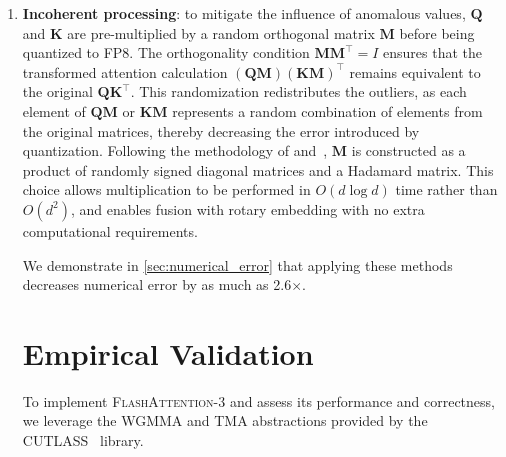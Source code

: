 \begin{algorithm}[H]
\begin{algorithmic}[1]
\begin{enumerate}
\item \textbf{Incoherent processing}: to mitigate the influence of anomalous values, $\mathbf{Q}$ and $\mathbf{K}$ are pre-multiplied by a random orthogonal matrix $\mathbf{M}$ before being quantized to FP8. The orthogonality condition $\mathbf{M} \mathbf{M}^\top = I$ ensures that the transformed attention calculation $(\mathbf{Q} \mathbf{M}) (\mathbf{K} \mathbf{M})^\top$ remains equivalent to the original $\mathbf{Q} \mathbf{K}^\top$. This randomization redistributes the outliers, as each element of $\mathbf{Q} \mathbf{M}$ or $\mathbf{K} \mathbf{M}$ represents a random combination of elements from the original matrices, thereby decreasing the error introduced by quantization. Following the methodology of \citet{chee2024quip} and~\citet{tseng2024quip}, $\mathbf{M}$ is constructed as a product of randomly signed diagonal matrices and a Hadamard matrix. This choice allows multiplication to be performed in $O(d \log d)$ time rather than $O(d^2)$, and enables fusion with rotary embedding with no extra computational requirements.

We demonstrate in \cref{sec:numerical_error} that applying these methods decreases numerical error by as much as 2.6$\times$.

\section{Empirical Validation}
\label{sec:exp}

To implement \textsc{FlashAttention-3} and assess its performance and correctness, we leverage the WGMMA and TMA abstractions provided by the CUTLASS~\citep{Thakkar_CUTLASS_2023} library.

\begin{itemize}


\end{itemize}
\end{enumerate}
\end{algorithmic}
\end{algorithm}
